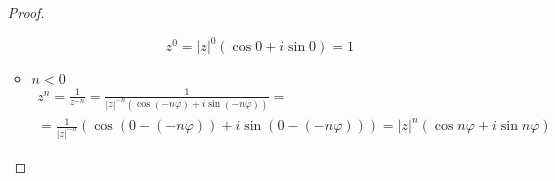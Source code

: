 \begin{itemize}
\begin{proof}
\begin{itemize}
            \[ z^0 = |z|^0(\cos 0 + i\sin 0) = 1 \]
            \item $n < 0$
            \begin{gather*}
                z^n = \frac{1}{z^{-n}} = \frac{1}{|z|^{-n}(\cos(-n\varphi) + i\sin(-n\varphi))} = \\
                = \frac{1}{|z|^{-n}}(\cos(0 - (-n\varphi)) + i\sin(0 - (-n\varphi))) = |z|^n(\cos n\varphi + i\sin n\varphi)
            \end{gather*}
        \end{itemize}
    \end{proof}
\end{itemize}